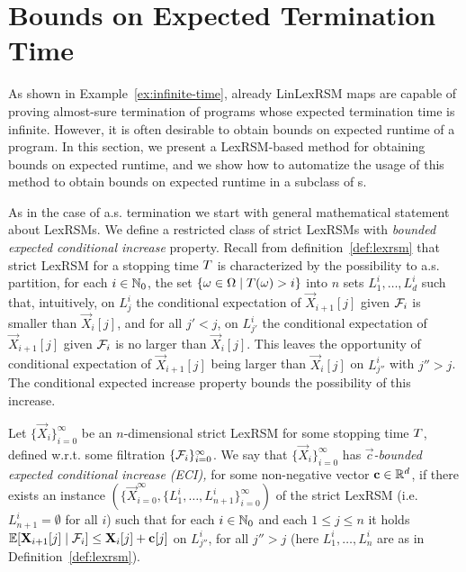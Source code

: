 \section{Bounds on Expected Termination Time}

As shown in Example~\ref{ex:infinite-time}, already LinLexRSM maps are capable 
of proving almost-sure termination of programs whose expected termination time 
is infinite. However, it is often desirable to obtain bounds on expected 
runtime of a program. In this section, we present a LexRSM-based method for 
obtaining bounds on expected runtime, and we show how to automatize the usage 
of this method to obtain bounds on expected runtime in a 
subclass of \PP{}s.

As in the case of a.s. termination we start with general mathematical statement 
about LexRSMs. We define a restricted class of strict LexRSMs with \emph{bounded 
expected conditional increase} property. Recall from 
definition~\ref{def:lexrsm} that strict
LexRSM for a stopping time $T$ is characterized by the possibility to 
a.s. partition, for each $i\in \mathbb{N}_0$, the set $\{\omega\in \Omega\mid 
T(\omega)>i \}$ into $n$ sets $L^i_1,\dots,L^i_d$ such that, intuitively, 
on $L^i_j$ the conditional expectation of $\vec{X}_{i+1}[j]$ given $\mathcal{F}_i$ 
is smaller than $\vec{X}_i[j]$, and for all $j'<j$, on $L^i_{j'}$ the 
conditional expectation of $\vec{X}_{i+1}[j]$ given $\mathcal{F}_i$ 
is no larger than $\vec{X}_i[j]$. This leaves the opportunity of conditional 
expectation of $\vec{X}_{i+1}[j]$ being larger than $\vec{X}_i[j]$ on 
$L^i_{j''}$ with $j''>j$. The conditional expected increase property bounds the 
possibility of this increase.

\begin{definition}
	\label{def:lexrsm-eci}
Let $\{\vec{X}_{i}\}_{i=0}^{\infty}$ be an 
$n$-dimensional strict LexRSM for some stopping time $T$, defined w.r.t. some 
filtration $\{\mathcal{F}_i\}_{i=0}^{\infty}$. We say that 
$\{\vec{X}_{i}\}_{i=0}^{\infty}$ has \emph{$\vec{c}$-bounded expected 
conditional 
increase (ECI),} for 
some non-negative vector $\mathbf{c}\in\mathbb{R}^d$, if there exists an instance $(\{\vec{X}_{i=0}^{\infty},\{L_1^i,\dots,L_{n+1}^i\}_{i=0}^{\infty})$ of the strict LexRSM (i.e. $L^i_{n+1}=\emptyset$ for all $i$) such that for each $i\in \mathbb{N}_0 $ and 
each $1\leq 
j \leq n $ it holds 
$\mathbb{E}[\mathbf{X}_{i+1}[j]\mid \mathcal{F}_i]\leq \mathbf{X}_{i}[j]+\mathbf{c}[j]$ on 
$L^i_{j''}$, 
for all $j''>j$ 
(here $L^i_1,\dots,L^i_n$ are as in Definition~\ref{def:lexrsm}).
\end{definition}


